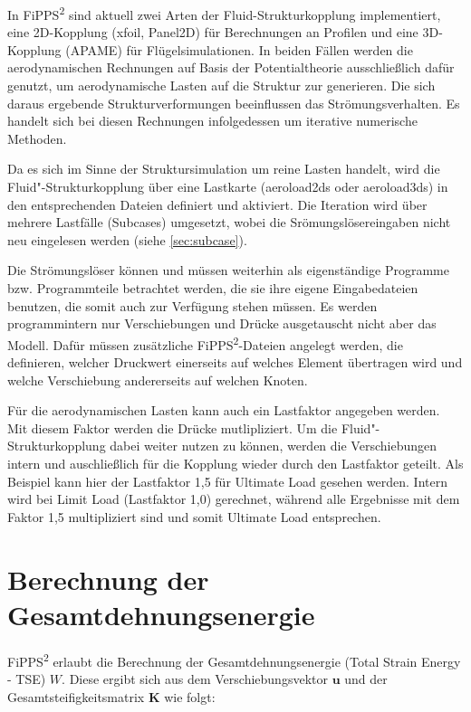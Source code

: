 \documentclass[11pt,titlepage,listof=totoc,bibliography=totoc,twoside]{scrreprt}
\begin{document}
In FiPPS\textsuperscript{2} sind aktuell zwei Arten der Fluid-Strukturkopplung implementiert, eine 2D-Kopplung (xfoil, Panel2D) für Berechnungen an Profilen und eine 3D-Kopplung (APAME) für Flügelsimulationen. In beiden Fällen werden die aerodynamischen Rechnungen auf Basis der Potentialtheorie ausschließlich dafür genutzt, um aerodynamische Lasten auf die Struktur zur generieren. Die sich daraus ergebende Strukturverformungen beeinflussen das Strömungsverhalten. Es handelt sich bei diesen Rechnungen infolgedessen um iterative numerische Methoden. 

Da es sich im Sinne der Struktursimulation um reine Lasten handelt, wird die Fluid"-Strukturkopplung über eine Lastkarte (aeroload2ds oder aeroload3ds) in den entsprechenden Dateien definiert und aktiviert. Die Iteration wird über mehrere Lastfälle (Subcases) umgesetzt, wobei die Srömungslösereingaben nicht neu eingelesen werden (siehe \ref{sec:subcase}).

Die Strömungslöser können und müssen weiterhin als eigenständige Programme bzw. Programmteile betrachtet werden, die sie ihre eigene Eingabedateien benutzen, die somit auch zur Verfügung stehen müssen. Es werden programmintern nur Verschiebungen und Drücke ausgetauscht nicht aber das Modell. Dafür müssen zusätzliche FiPPS\textsuperscript{2}-Dateien angelegt werden, die definieren, welcher Druckwert einerseits auf welches Element übertragen wird und welche Verschiebung andererseits auf welchen Knoten.

Für die aerodynamischen Lasten kann auch ein Lastfaktor angegeben werden. Mit diesem Faktor werden die Drücke mutlipliziert. Um die Fluid"-Strukturkopplung dabei weiter nutzen zu können, werden die Verschiebungen intern und auschließlich für die Kopplung wieder durch den Lastfaktor geteilt. Als Beispiel kann hier der Lastfaktor 1,5 für Ultimate Load gesehen werden. Intern wird bei Limit Load (Lastfaktor 1,0) gerechnet, während alle Ergebnisse mit dem Faktor 1,5 multipliziert sind und somit Ultimate Load entsprechen.

\section{Berechnung der Gesamtdehnungsenergie}

FiPPS\textsuperscript{2} erlaubt die Berechnung der Gesamtdehnungsenergie (Total Strain Energy - TSE) $W$. Diese ergibt sich aus dem Verschiebungsvektor $\mathbf{u}$ und der Gesamtsteifigkeitsmatrix $\mathbf{K}$ wie folgt:
\end{document}
